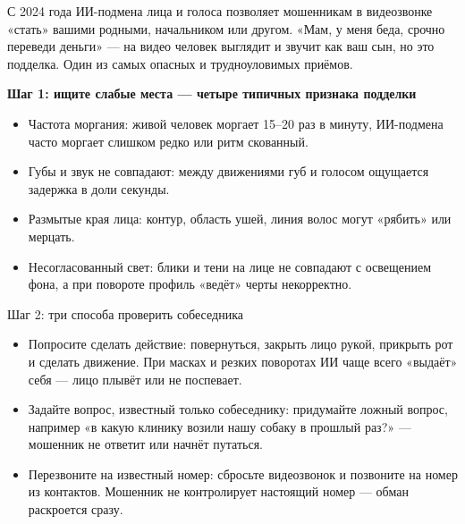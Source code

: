 С 2024 года ИИ-подмена лица и голоса позволяет мошенникам в видеозвонке «стать» вашими родными, начальником или другом. «Мам, у меня беда, срочно переведи деньги» — на видео человек выглядит и звучит как ваш сын, но это подделка. Один из самых опасных и трудноуловимых приёмов.

\textbf{Шаг 1: ищите слабые места — четыре типичных признака подделки}\par

\begin{itemize}
  \item Частота моргания: живой человек моргает 15–20 раз в минуту, ИИ-подмена часто моргает слишком редко или ритм скованный.
  \item Губы и звук не совпадают: между движениями губ и голосом ощущается задержка в доли секунды.
  \item Размытые края лица: контур, область ушей, линия волос могут «рябить» или мерцать.
  \item Несогласованный свет: блики и тени на лице не совпадают с освещением фона, а при повороте профиль «ведёт» черты некорректно.
\end{itemize}

\begin{tcbinfo}{Шаг 2: три способа проверить собеседника}
\begin{itemize}
  \item Попросите сделать действие: повернуться, закрыть лицо рукой, прикрыть рот и сделать движение. При масках и резких поворотах ИИ чаще всего «выдаёт» себя — лицо плывёт или не поспевает.
  \item Задайте вопрос, известный только собеседнику: придумайте ложный вопрос, например «в какую клинику возили нашу собаку в прошлый раз?» — мошенник не ответит или начнёт путаться.
  \item Перезвоните на известный номер: сбросьте видеозвонок и позвоните на номер из контактов. Мошенник не контролирует настоящий номер — обман раскроется сразу.
\end{itemize}

\end{tcbinfo}

